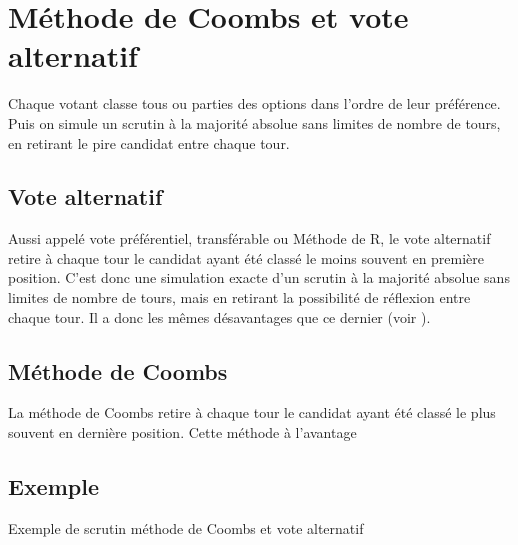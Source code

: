 \documentclass[../report]{subfiles}
\begin{document}
  \section{Méthode de Coombs et vote alternatif}

  Chaque votant classe tous ou parties des options dans l'ordre de leur préférence.
  Puis on simule un scrutin à la majorité absolue sans limites de nombre de tours, en retirant le pire candidat
  entre chaque tour.

  \subsection{Vote alternatif}
  Aussi appelé vote préférentiel, transférable ou Méthode de R, le vote alternatif retire à chaque 
  tour le candidat ayant été classé le moins souvent en première position.
  C'est donc une simulation exacte d'un scrutin à la majorité absolue sans limites de nombre de tours, 
  mais en retirant la possibilité de réflexion entre chaque tour. 
  Il a donc les mêmes désavantages que ce dernier (voir ).

  \subsection{Méthode de Coombs}
  La méthode de Coombs retire à chaque tour le candidat ayant été classé le plus souvent en dernière position.
  Cette méthode à l'avantage 

  \subsection{Exemple}

  \begin{table}[h]
    \begin{center}
      \caption{Exemple de scrutin méthode de Coombs et vote alternatif}%
      \label{fig:diff:coombs:caslim1}
      \\[1em]
    \end{center}
  \end{table}
\end{document}
